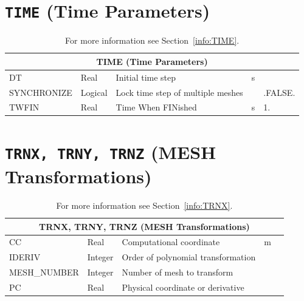 \documentclass[11pt]{book}
\begin{document}
\vfill

\section{\texorpdfstring{{\tt TIME}}{TIME} (Time Parameters)}

\hspace{1in}

\begin{table}[H]
\caption{For more information see Section~\ref{info:TIME}.}\label{tbl:TIME}
\noindent
\begin{tabular*}{\textwidth}{@{\extracolsep{\fill}}|l|l|l|l|l|}
\hline
\multicolumn{5}{|c|}{{\ct TIME} (Time Parameters)} \\ \hline \hline
{\ct DT    }      & Real        & Initial time step                  & s           &     \\ \hline
{\ct SYNCHRONIZE} & Logical     & Lock time step of multiple meshes  &             & {\ct .FALSE.}    \\ \hline
{\ct TWFIN }      & Real        & Time When FINished                 & s           & 1.  \\ \hline
\end{tabular*}
\end{table}

\vspace{\baselineskip}

\vfill

\section{\texorpdfstring{{\tt TRNX, TRNY, TRNZ}}{TRNX, TRNY, TRNZ} (MESH Transformations)}

\hspace{1in}

\begin{table}[H]
\caption{For more information see Section~\ref{info:TRNX}.}\label{tbl:TRNX}
\noindent
\begin{tabular*}{\textwidth}{@{\extracolsep{\fill}}|l|l|l|l|l|}
\hline
\multicolumn{5}{|c|}{{\ct TRNX, TRNY, TRNZ} (MESH Transformations)} \\ \hline \hline
{\ct CC    }            & Real          & Computational coordinate           & m            &     \\ \hline
{\ct IDERIV}            & Integer       & Order of polynomial transformation &              &     \\ \hline
{\ct MESH\_NUMBER}      & Integer       & Number of mesh to transform        &              &     \\ \hline
{\ct PC    }            & Real          & Physical coordinate or derivative  &              &     \\ \hline
\end{tabular*}
\end{table}
\end{document}
